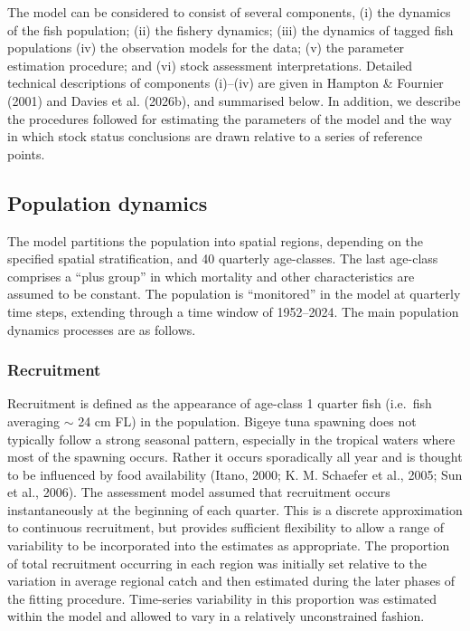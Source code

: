 \documentclass[
  english,
  a4paper,
  a4paper,
  11pt]{SCreport}
\begin{document}
The model can be considered to consist of several components, (i) the
dynamics of the fish population; (ii) the fishery dynamics; (iii) the
dynamics of tagged fish populations (iv) the observation models for the
data; (v) the parameter estimation procedure; and (vi) stock assessment
interpretations. Detailed technical descriptions of components (i)--(iv)
are given in Hampton \& Fournier (2001) and Davies et al. (2026b), and
summarised below. In addition, we describe the procedures followed for
estimating the parameters of the model and the way in which stock status
conclusions are drawn relative to a series of reference points.

\subsection{Population dynamics}\label{sec-model-population-dynamics}

The model partitions the population into spatial regions, depending on
the specified spatial stratification, and 40 quarterly age-classes. The
last age-class comprises a ``plus group'' in which mortality and other
characteristics are assumed to be constant. The population is
``monitored'' in the model at quarterly time steps, extending through a
time window of 1952--2024. The main population dynamics processes are as
follows.

\subsubsection{Recruitment}\label{sec-model-recruitment}

Recruitment is defined as the appearance of age-class 1 quarter fish
(i.e.~fish averaging \(\sim\) 24 cm FL) in the population. Bigeye tuna
spawning does not typically follow a strong seasonal pattern, especially
in the tropical waters where most of the spawning occurs. Rather it
occurs sporadically all year and is thought to be influenced by food
availability (Itano, 2000; K. M. Schaefer et al., 2005; Sun et al.,
2006). The assessment model assumed that recruitment occurs
instantaneously at the beginning of each quarter. This is a discrete
approximation to continuous recruitment, but provides sufficient
flexibility to allow a range of variability to be incorporated into the
estimates as appropriate. The proportion of total recruitment occurring
in each region was initially set relative to the variation in average
regional catch and then estimated during the later phases of the fitting
procedure. Time-series variability in this proportion was estimated
within the model and allowed to vary in a relatively unconstrained
fashion.
\end{document}
